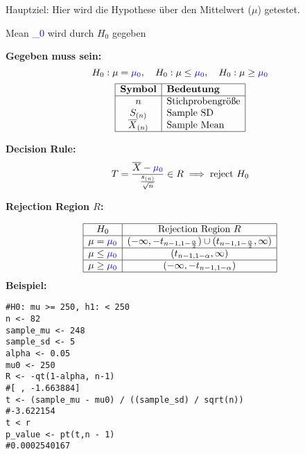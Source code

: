 \begin{multicols*}{2}
\columnbreak
\begin{center}
\end{center}
\normalsize
Hauptziel: Hier wird die Hypothese über den Mittelwert ($\mu$) getestet.
\begin{center}

\textcolor{red}{\warning} Mean \textcolor{blue}{\mu_0} wird durch $H_0$ gegeben \textcolor{red}{\warning}
\end{center}
\large{\textbf{Gegeben muss sein:}}
\[
H_0: \mu = \textcolor{blue}{\mu_0}, \quad H_0: \mu \leq \textcolor{blue}{\mu_0}, \quad H_0: \mu \geq \textcolor{blue}{\mu_0}
\]
\[
\begin{array}{|c|l|}
\hline
\textbf{Symbol} & \textbf{Bedeutung} \\
\hline
n & \text{Stichprobengröße} \\
S_{(n)} & \text{Sample SD} \\
\overline{X}_{(n)} & \text{Sample Mean} \\
\hline
\end{array}
\]

\begin{comment}
\large{\textbf{Teststatistik:}}

\[
T = \frac{\overline{X}_{(n)} - \textcolor{blue}{\mu}}{\frac{s_{(n)}}{\sqrt{n}}} \sim t_{n-1},\text{with }
s^2_{(n)} = \frac{1}{n-1} \sum_{i=1}^n (X_i - \overline{X}_{(n)})^2
\]
\end{comment}
\large{\textbf{Decision Rule:}}
\[
T = \frac{\overline{X} - \textcolor{blue}{\mu_0}}{\frac{s_{(n)}}{\sqrt{n}}} \in R \implies \text{reject } H_0
\]

\large{\textbf{Rejection Region \(R\):}}

\[
\begin{array}{|c|c|}
\hline
H_0 & \text{Rejection Region } R \\ \hline
\mu = \textcolor{blue}{\mu_0} & (-\infty, -t_{n-1, 1-\frac{\alpha}{2}}) \cup (t_{n-1, 1-\frac{\alpha}{2}}, \infty) \\ \hline
\mu \leq \textcolor{blue}{\mu_0} & (t_{n-1, 1-\alpha}, \infty) \\ \hline
\mu \geq \textcolor{blue}{\mu_0} & (-\infty, -t_{n-1, 1-\alpha}) \\ \hline
\end{array}
\]
\large{\textbf{Beispiel:}}
\begin{lstlisting}
#H0: mu >= 250, h1: < 250
n <- 82
sample_mu <- 248
sample_sd <- 5
alpha <- 0.05
mu0 <- 250
R <- -qt(1-alpha, n-1)
#[ , -1.663884]
t <- (sample_mu - mu0) / ((sample_sd) / sqrt(n))
#-3.622154
t < r
p_value <- pt(t,n - 1)
#0.0002540167
\end{lstlisting}
\columnbreak


\end{multicols*}

